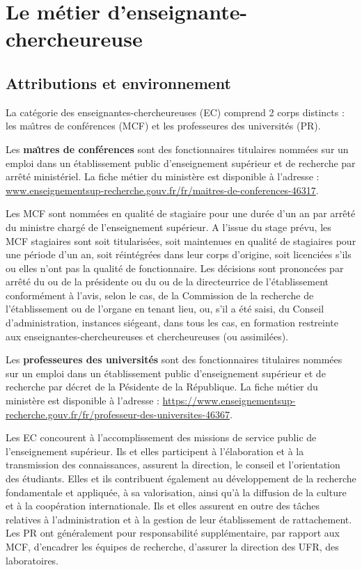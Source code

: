 \chapter{Le m\'etier d'enseignant\mp e-chercheur\mp euse}


\section{Attributions et environnement}
La cat\'egorie des enseignant\mp e\mp s-chercheur\mp euse\mp s (EC) comprend 2 corps distincts :
les ma\^\i tres de conf\'erences (MCF) et les professeur\mp e\mp s des universit\'es (PR).

Les \textbf{ma\^\i  tres de conf\'erences} sont des fonctionnaires titulaires
nomm\'e\mp e\mp s sur un emploi dans un \'etablissement public d'enseignement
sup\'erieur et de recherche par arr\^et\'e minist\'eriel. La fiche m\'etier du minist\`ere est disponible \`a l'adresse :
\url{www.enseignementsup-recherche.gouv.fr/fr/maitres-de-conferences-46317}.

Les MCF sont nomm\'e\mp e\mp s en qualit\'e de stagiaire pour une dur\'ee d'un an par arr\^ et\'e du ministre charg\'e de l'enseignement sup\'erieur.
A l'issue du stage pr\'evu, les MCF stagiaires sont soit titularis\'e\mp e\mp s, soit maintenu\mp e\mp s en qualit\'e de stagiaires pour une p\'eriode d'un an, soit r\'eint\'egr\'e\mp e\mp s dans leur corps d'origine, soit licenci\'e\mp e\mp s s'ils ou elles n'ont pas la qualit\'e de fonctionnaire. Les d\'ecisions sont prononc\'ees par arr\^ et\'e du ou de la pr\'esident\mp e ou du ou de la directeur\mp rice de l'\'etablissement conform\'ement \`a l'avis, selon le cas, de la Commission de la recherche de l'\'etablissement ou de l'organe en tenant lieu, ou, s'il a \'et\'e saisi, du Conseil d'administration, instances si\'egeant, dans tous les cas, en formation restreinte aux enseignant\mp e\mp s-chercheur\mp euse\mp s et chercheur\mp euse\mp s (ou assimil\'e\mp e\mp s).

Les \textbf{professeur\mp e\mp s des universit\'es} sont des fonctionnaires titulaires nomm\'e\mp e\mp s sur un emploi dans un \'etablissement public d'enseignement
sup\'erieur et de recherche par d\'ecret de la P\'esident\mp e de la R\'epublique. La fiche m\'etier du minist\`ere est disponible \`a l'adresse : \url{https://www.enseignementsup-recherche.gouv.fr/fr/professeur-des-universites-46367}.

 
Les EC concourent \`a l'accomplissement des missions de service
public de l'enseignement sup\'erieur. Ils et elles participent \`a
l'\'elaboration et \`a la transmission des connaissances, assurent
la direction, le conseil et l'orientation des \'etudiants. Elles et ils
contribuent \'egalement au d\'eveloppement de la recherche
fondamentale et appliqu\'ee, \`a sa valorisation, ainsi qu'\`a la
diffusion de la culture et \`a la coop\'eration internationale. Ils et elles
assurent en outre des t\^aches relatives \`a l'administration et \`a
la gestion de leur \'etablissement de rattachement. Les PR ont g\'en\'eralement pour responsabilit\'e suppl\'ementaire, par
rapport aux MCF, d'encadrer les \'equipes de
recherche, d'assurer la direction des UFR, des laboratoires.

